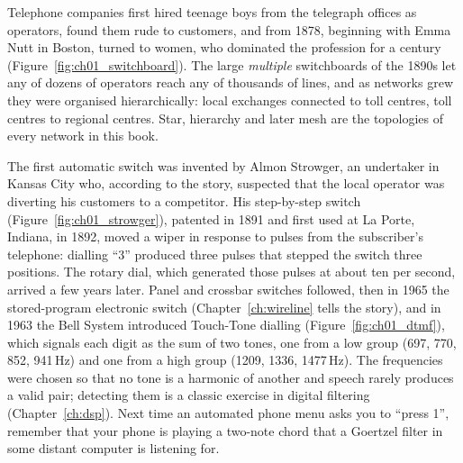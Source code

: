 
Telephone companies first hired teenage boys from the telegraph offices as operators, found them rude
to customers, and from 1878, beginning with Emma Nutt in Boston, turned to women, who dominated the
profession for a century (Figure~\ref{fig:ch01_switchboard}). The large \emph{multiple} switchboards
of the 1890s let any of dozens of operators reach any of thousands of lines, and as networks grew they
were organised hierarchically: local exchanges connected to toll centres, toll centres to regional
centres. Star, hierarchy and later mesh are the topologies of every network in this book.



The first automatic switch was invented by Almon Strowger, an undertaker in Kansas City who,
according to the story, suspected that the local operator was diverting his customers to a
competitor. His step-by-step switch (Figure~\ref{fig:ch01_strowger}), patented in 1891 and first used
at La Porte, Indiana, in 1892, moved a wiper in response to pulses from the subscriber's telephone:
dialling ``3'' produced three pulses that stepped the switch three positions. The rotary dial, which
generated those pulses at about ten per second, arrived a few years later. Panel and crossbar
switches followed, then in 1965 the stored-program electronic switch (Chapter~\ref{ch:wireline} tells
the story), and in 1963 the Bell System introduced Touch-Tone dialling (Figure~\ref{fig:ch01_dtmf}), which signals each digit as
the sum of two tones, one from a low group (697, 770, 852, 941\,Hz) and one from a high group (1209,
1336, 1477\,Hz). The frequencies were chosen so that no tone is a harmonic of another and speech
rarely produces a valid pair; detecting them is a classic exercise in digital filtering
(Chapter~\ref{ch:dsp}). Next time an automated phone menu asks you to ``press 1'', remember that your
phone is playing a two-note chord that a Goertzel filter in some distant computer is listening for.

